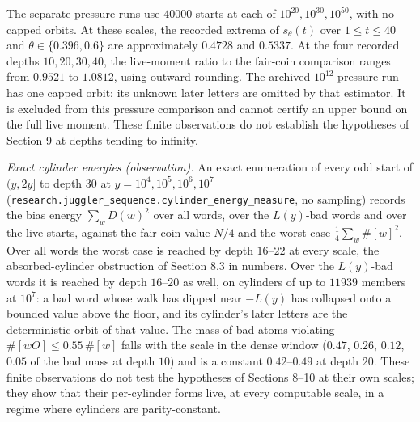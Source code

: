 \documentclass[11pt,a4paper]{article}
\begin{document}
The separate pressure runs use \(40000\) starts at each of
\(10^{20},10^{30},10^{50}\), with no capped orbits. At these scales, the
recorded extrema of \(s_\theta(t)\) over \(1\le t\le40\) and
\(\theta\in\{0.396,0.6\}\) are approximately \(0.4728\) and \(0.5337\).
At the four recorded depths \(10,20,30,40\), the live-moment ratio to
the fair-coin comparison ranges from \(0.9521\) to \(1.0812\), using
outward rounding. The archived \(10^{12}\) pressure run has one capped
orbit; its unknown later letters are omitted by that estimator. It is
excluded from this pressure comparison and cannot certify an upper bound
on the full live moment. These finite observations do not establish the
hypotheses of Section 9 at depths tending to infinity.

\emph{Exact cylinder energies (observation).} An exact enumeration of
every odd start of \((y,2y]\) to depth \(30\) at
\(y=10^4,10^5,10^6,10^7\)
(\texttt{\nolinkurl{research.juggler_sequence.cylinder_energy_measure}},
no sampling) records the bias energy \(\sum_wD(w)^2\) over all words,
over the \(L(y)\)-bad words and over the live starts, against the
fair-coin value \(N/4\) and the worst case \(\tfrac14\sum_w\#[w]^2\).
Over all words the worst case is reached by depth \(16\)--\(22\) at
every scale, the absorbed-cylinder obstruction of Section 8.3 in
numbers. Over the \(L(y)\)-bad words it is reached by depth
\(16\)--\(20\) as well, on cylinders of up to \(11939\) members at
\(10^7\): a bad word whose walk has dipped near \(-L(y)\) has collapsed
onto a bounded value above the floor, and its cylinder's later letters
are the deterministic orbit of that value. The mass of bad atoms
violating \(\#[wO]\le0.55\,\#[w]\) falls with the scale in the dense
window (\(0.47\), \(0.26\), \(0.12\), \(0.05\) of the bad mass at depth
\(10\)) and is a constant \(0.42\)--\(0.49\) at depth \(20\). These
finite observations do not test the hypotheses of Sections 8--10 at
their own scales; they show that their per-cylinder forms live, at every
computable scale, in a regime where cylinders are parity-constant.
\end{document}
